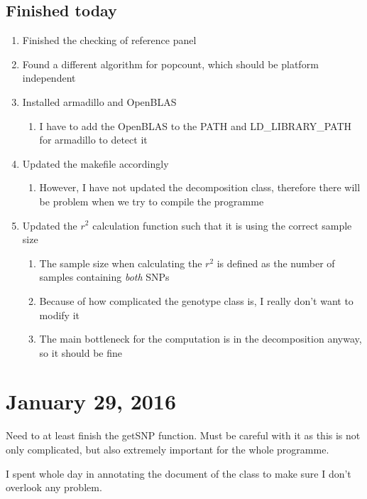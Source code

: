 \documentclass[12pt]{article}
\begin{document}
	\subsection{Finished today}
	\begin{enumerate}
		\item Finished the checking of reference panel
		\item Found a different algorithm for popcount, which should be platform independent
		\item Installed armadillo and OpenBLAS
		\begin{enumerate}
			\item I have to add the OpenBLAS to the PATH and LD\_LIBRARY\_PATH for armadillo to detect it
		\end{enumerate}
		\item Updated the makefile accordingly
		\begin{enumerate}
			\item However, I have not updated the decomposition class, therefore there will be problem when we try to compile the programme
		\end{enumerate}
		\item Updated the $r^2$ calculation function such that it is using the correct sample size
		\begin{enumerate}
			\item The sample size when calculating the $r^2$ is defined as the number of samples containing \emph{both} SNPs
			\item Because of how complicated the genotype class is, I really don't want to modify it
			\item The main bottleneck for the computation is in the decomposition anyway, so it should be fine
		\end{enumerate}
		
	\end{enumerate}
	
	\section{January 29, 2016}
	Need to at least finish the getSNP function.
	Must be careful with it as this is not only complicated, but also extremely important for the whole programme.
	
	I spent whole day in annotating the document of the class to make sure I don't overlook any problem.
	
\end{document}

